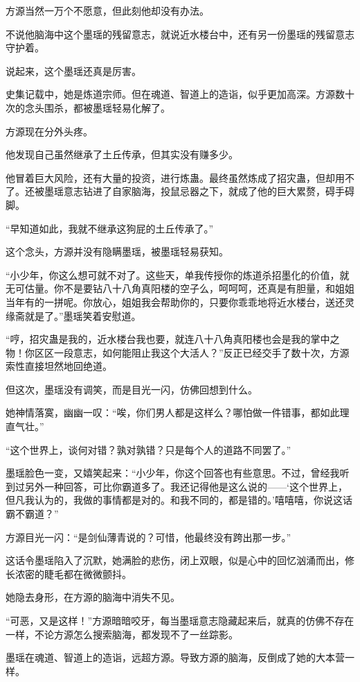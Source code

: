 \begin{this_body}
方源当然一万个不愿意，但此刻他却没有办法。

不说他脑海中这个墨瑶的残留意志，就说近水楼台中，还有另一份墨瑶的残留意志守护着。

说起来，这个墨瑶还真是厉害。

史集记载中，她是炼道宗师。但在魂道、智道上的造诣，似乎更加高深。方源数十次的念头围杀，都被墨瑶轻易化解了。

方源现在分外头疼。

他发现自己虽然继承了土丘传承，但其实没有赚多少。

他冒着巨大风险，还有大量的投资，进行炼蛊。最终虽然炼成了招灾蛊，但却用不了。还被墨瑶意志钻进了自家脑海，投鼠忌器之下，就成了他的巨大累赘，碍手碍脚。

“早知道如此，我就不继承这狗屁的土丘传承了。”

这个念头，方源并没有隐瞒墨瑶，被墨瑶轻易获知。

“小少年，你这么想可就不对了。这些天，单我传授你的炼道杀招墨化的价值，就无可估量。你不是要钻八十八角真阳楼的空子么，呵呵呵，还真是有胆量，和姐姐当年有的一拼呢。你放心，姐姐我会帮助你的，只要你乖乖地将近水楼台，送还灵缘斋就是了。”墨瑶笑着安慰道。

“哼，招灾蛊是我的，近水楼台我也要，就连八十八角真阳楼也会是我的掌中之物！你区区一段意志，如何能阻止我这个大活人？”反正已经交手了数十次，方源索性直接坦然地回绝道。

但这次，墨瑶没有调笑，而是目光一闪，仿佛回想到什么。

她神情落寞，幽幽一叹：“唉，你们男人都是这样么？哪怕做一件错事，都如此理直气壮。”

“这个世界上，谈何对错？孰对孰错？只是每个人的道路不同罢了。”

墨瑶脸色一变，又嬉笑起来：“小少年，你这个回答也有些意思。不过，曾经我听到过另外一种回答，可比你霸道多了。我还记得他是这么说的——‘这个世界上，但凡我认为的，我做的事情都是对的。和我不同的，都是错的。’嘻嘻嘻，你说这话霸不霸道？”

方源目光一闪：“是剑仙薄青说的？可惜，他最终没有跨出那一步。”

这话令墨瑶陷入了沉默，她满脸的悲伤，闭上双眼，似是心中的回忆汹涌而出，修长浓密的睫毛都在微微颤抖。

她隐去身形，在方源的脑海中消失不见。

“可恶，又是这样！”方源暗暗咬牙，每当墨瑶意志隐藏起来后，就真的仿佛不存在一样，不论方源怎么搜索脑海，都发现不了一丝踪影。

墨瑶在魂道、智道上的造诣，远超方源。导致方源的脑海，反倒成了她的大本营一样。


\end{this_body}
